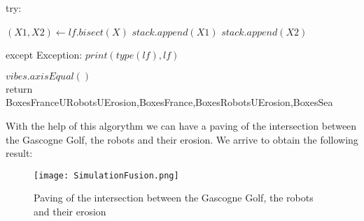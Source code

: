 \begin{algorithm}
\begin{algorithmic}
     	\Else
     	
     		try:
     
          			\State $(X1, X2)\gets lf.bisect(X)$
          			\State $stack.append(X1)$
         			\State $stack.append(X2)$
         		\EndIf
         		
         except Exception:
        		 \State $print(type(lf),lf)  $
         	
  		\EndIf
 	 \EndWhile 
	
	\vspace{0.3 cm}
	
  \State $vibes.axisEqual()$\\
  return BoxesFranceURobotsUErosion,BoxesFrance,BoxesRobotsUErosion,BoxesSea


  \end{algorithmic}
\end{algorithm}

\vfill

\clearpage



\newpage

	With the help of this algorythm we can have a paving of the intersection between the Gascogne Golf, the robots and their erosion. We arrive to obtain the following result:
	

	
	\begin{figure}[!h] 
    \center
    	\texttt{[image: SimulationFusion.png]} 
    	\caption{Paving of the intersection between the Gascogne Golf, the robots and their erosion } 
    \label{S1 U S2}
	\end{figure} 
	
	
	
	
	


